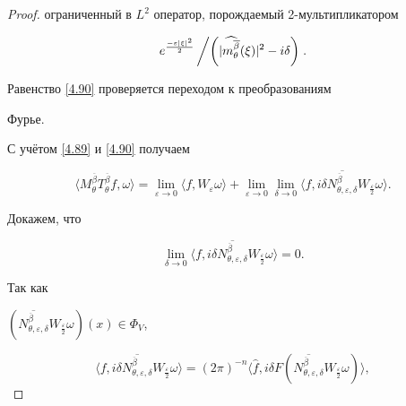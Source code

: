 \begin{proof}
ограниченный в $L^2$ оператор, порождаемый 2-мультипликатором

$$

{e^\frac{-\varepsilon|\xi|^2}2}\left/\left({|\widehat{m_{\theta}^{\overline{\beta}}}(\xi)|^2-i\delta}\right)\right..

$$

Равенство \eqref{4.90} проверяется переходом к преобразованиям

Фурье.



С учётом \eqref{4.89} и \eqref{4.90} получаем

\begin{equation}

  \langle M_\theta^{\overline{\beta}}T_\theta^{\overline{\beta}}f,

 \omega\rangle=\lim\limits_{\varepsilon\to 0}\langle f,

W_\varepsilon \omega\rangle +\lim\limits_{\varepsilon\to

0}\lim\limits_{\delta\to 0}\langle f,

 i\delta \overline{N_{\theta,\varepsilon,\delta}^{\overline{\beta}}}W_{\frac\varepsilon 2}

 \omega\rangle.\label{4.91}

\end{equation}



Докажем, что

\begin{equation}\label{4.92}

 \lim\limits_{\delta\to 0}\langle f,

 i\delta \overline{N_{\theta,\varepsilon,\delta}^{\overline{\beta}}}W_{\frac\varepsilon 2}

 \omega\rangle =0.

\end{equation}

Так как

$(\overline{N_{\theta,\varepsilon,\delta}^{\overline{\beta}}}W_{\frac\varepsilon

2} \omega)(x) \in \Phi_V$, 

\[

 \langle f, i\delta \overline{N_{\theta,\varepsilon,\delta}^{\overline{\beta}}}W_{\frac\varepsilon 2}\omega\rangle =

 (2\pi)^{-n}\langle \widehat{f}, i\delta F(\overline{N_{\theta,\varepsilon,\delta}^{\overline{\beta}}}W_{\frac\varepsilon

 2}\omega)\rangle,

\]
\end{proof}
